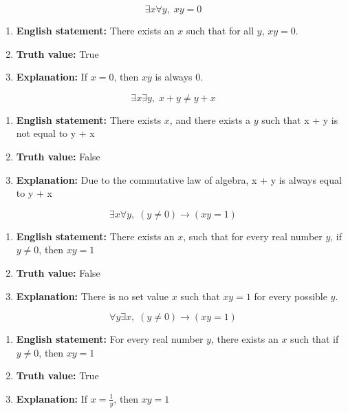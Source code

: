 \documentclass[]{article}
\begin{document}
\begin{question}{1.4}
\[
\exists x\forall y,\; xy = 0
\]
\end{question}
\begin{enumerate}[label=(\alph*)]
    \item \textbf{English statement:} There exists an $x$ such that for all $y$, $xy=0$.
    \item \textbf{Truth value:} True
    \item \textbf{Explanation:} If $x=0$, then $xy$ is always $0$.
\end{enumerate}

\begin{question}{1.5}
\[
\exists x \exists y,\; x + y\ne y +x
\]
\end{question}
\begin{enumerate}[label=(\alph*)]
    \item \textbf{English statement:} There exists $x$, and there exists a $y$ such that x + y is not equal to y + x
    \item \textbf{Truth value:} False
    \item \textbf{Explanation:} Due to the commutative law of algebra, x + y is always equal to y + x
\end{enumerate}

\begin{question}{1.6}
\[
\exists x \forall y,\; (y \ne 0) \rightarrow (xy = 1)
\]
\end{question}
\begin{enumerate}[label=(\alph*)]
    \item \textbf{English statement:} There exists an $x$, such that for every real number $y$, if $y \ne 0$, then $xy = 1$
    \item \textbf{Truth value:} False
    \item \textbf{Explanation:} There is no set value $x$ such that $xy = 1$ for every possible $y$.
\end{enumerate}

\begin{question}{1.7}
\[
\forall y \exists x,\; (y \ne 0) \rightarrow (xy = 1)
\]
\end{question}
\begin{enumerate}[label=(\alph*)]
    \item \textbf{English statement:} For every real number $y$, there exists an $x$ such that if $y \ne 0$, then $xy = 1$
    \item \textbf{Truth value:} True
    \item \textbf{Explanation:} If $x = \frac{1}{y}$, then $xy= 1$
\end{enumerate}
\end{document}
